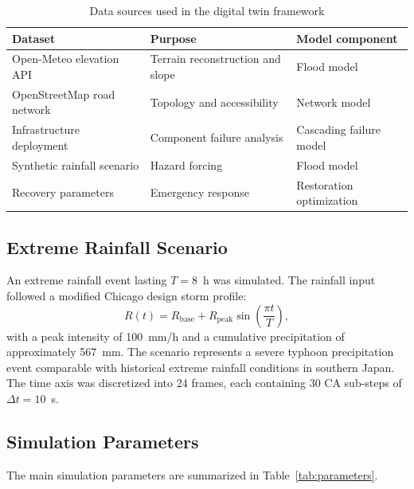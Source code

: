 \documentclass[preprint,12pt]{elsarticle}
\begin{document}
\begin{table}[H]
\centering
\caption{Data sources used in the digital twin framework}
\label{tab:data}
\begin{tabular}{lll}
\toprule
Dataset & Purpose & Model component \\
\midrule
Open-Meteo elevation API & Terrain reconstruction and slope & Flood model \\
OpenStreetMap road network & Topology and accessibility & Network model \\
Infrastructure deployment & Component failure analysis & Cascading failure model \\
Synthetic rainfall scenario & Hazard forcing & Flood model \\
Recovery parameters & Emergency response & Restoration optimization \\
\bottomrule
\end{tabular}
\end{table}

\subsection{Extreme Rainfall Scenario}
An extreme rainfall event lasting $T=8$~h was simulated. The rainfall input
followed a modified Chicago design storm profile:
\begin{equation}\label{eq:rainfall}
R(t) = R_{\mathrm{base}} + R_{\mathrm{peak}} \sin\!\left(\frac{\pi t}{T}\right),
\end{equation}
with a peak intensity of 100~mm/h and a cumulative precipitation of
approximately 567~mm. The scenario represents a severe typhoon precipitation
event comparable with historical extreme rainfall conditions in southern
Japan. The time axis was discretized into 24 frames, each containing 30 CA
sub-steps of $\Delta t = 10$~s.

\subsection{Simulation Parameters}
The main simulation parameters are summarized in
Table~\ref{tab:parameters}.
\end{document}
